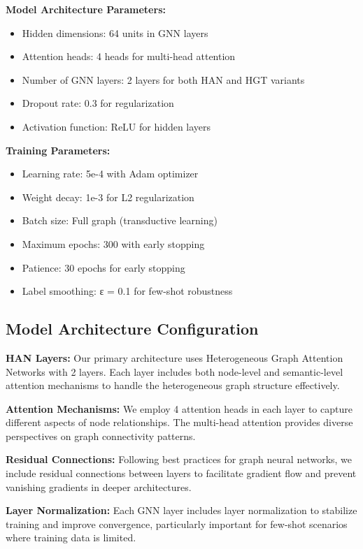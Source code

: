 \textbf{Model Architecture Parameters:}
\begin{itemize}
\item Hidden dimensions: 64 units in GNN layers  
\item Attention heads: 4 heads for multi-head attention
\item Number of GNN layers: 2 layers for both HAN and HGT variants
\item Dropout rate: 0.3 for regularization
\item Activation function: ReLU for hidden layers
\end{itemize}

\textbf{Training Parameters:}
\begin{itemize}
\item Learning rate: 5e-4 with Adam optimizer
\item Weight decay: 1e-3 for L2 regularization  
\item Batch size: Full graph (transductive learning)
\item Maximum epochs: 300 with early stopping
\item Patience: 30 epochs for early stopping
\item Label smoothing: ε = 0.1 for few-shot robustness
\end{itemize}

\subsection{Model Architecture Configuration}

\textbf{HAN Layers:} Our primary architecture uses Heterogeneous Graph Attention Networks with 2 layers. Each layer includes both node-level and semantic-level attention mechanisms to handle the heterogeneous graph structure effectively.

\textbf{Attention Mechanisms:} We employ 4 attention heads in each layer to capture different aspects of node relationships. The multi-head attention provides diverse perspectives on graph connectivity patterns.

\textbf{Residual Connections:} Following best practices for graph neural networks, we include residual connections between layers to facilitate gradient flow and prevent vanishing gradients in deeper architectures.

\textbf{Layer Normalization:} Each GNN layer includes layer normalization to stabilize training and improve convergence, particularly important for few-shot scenarios where training data is limited.

